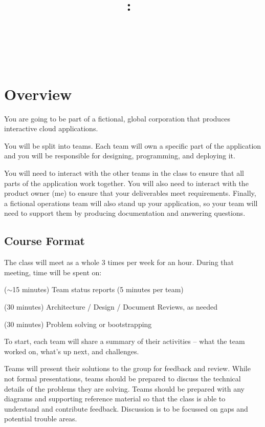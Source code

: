 \documentclass{article}
\title{
\vspace{2in}
\textmd{\textbf{\hmwkClass:\ \hmwkTitle}}\\
\normalsize\vspace{0.1in}\hmwkDueDate\\
\vspace{0.1in}\large{\textit{\hmwkClassInstructor\ \hmwkClassTime}}
\vspace{3in}
}
\author{\textbf{\hmwkAuthorName}}
\date{} %
\newcommand{\enterProblemHeader}[1]{
}
\newcommand{\exitProblemHeader}[1]{
\nobreak\extramarks{#1}{}\nobreak
}
\newcounter{homeworkProblemCounter} %
\newcommand{\homeworkProblemName}{}
\newenvironment{homeworkProblem}[1][Problem \arabic{homeworkProblemCounter}]{ %
\stepcounter{homeworkProblemCounter} %
\renewcommand{\homeworkProblemName}{#1} %
\section{\homeworkProblemName} %
\enterProblemHeader{\homeworkProblemName} %
}{
\exitProblemHeader{\homeworkProblemName} %
}
\newcommand{\homeworkSectionName}{}
\newenvironment{homeworkSection}[1]{ %
\renewcommand{\homeworkSectionName}{#1} %
\subsection{\homeworkSectionName} %
\enterProblemHeader{\homeworkProblemName\ [\homeworkSectionName]} %
}{
\enterProblemHeader{\homeworkProblemName} %
}
\begin{document}
\maketitle\thispagestyle{empty}

\begin{homeworkProblem}[Overview]

  You are going to be part of a fictional, global corporation that produces interactive cloud applications.
	
	You will be split into teams. Each team will own a specific part of the application and you will be responsible for designing, programming, and deploying it. 
	
	You will need to interact with the other teams in the class to ensure that all parts of the application work together. You will also need to interact with the product owner (me) to ensure that your deliverables meet requirements. Finally, a fictional operations team will also stand up your application, so your team will need to support them by producing documentation and answering questions.

\begin{homeworkSection}{Course Format}
  The class will meet as a whole 3 times per week for an hour. During that meeting, time will be spent on:
	\begin{compactitem}
		\item ($\sim$15 minutes) Team status reports (5 minutes per team)
		\item (30 minutes) Architecture / Design / Document Reviews, as needed
		\item (30 minutes) Problem solving or bootstrapping
	\end{compactitem}

	To start, each team will share a summary of their activities -- what the team worked on, what's up next, and challenges.
	
	Teams will present their solutions to the group for feedback and review. While not formal presentations, teams should be prepared to discuss the technical details of the problems they are solving. Teams should be prepared with any diagrams and supporting reference material so that the class is able to understand and contribute feedback. Discussion is to be focussed on gaps and potential trouble areas.


\end{homeworkSection}
\end{homeworkProblem}
\end{document}
